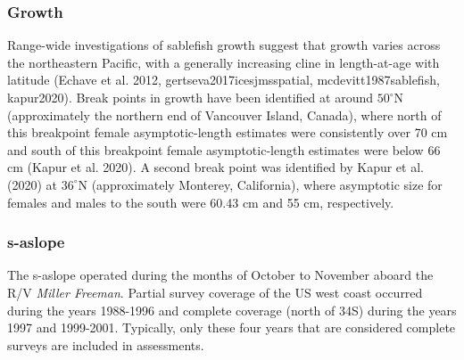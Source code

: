 \documentclass[11pt,
  english,
  a4paper,
]{article}
\begin{document}
\leavevmode\tagmcend\tagstructend\par


\hypertarget{growth}{%
\subsubsection{Growth}\label{growth}}

\leavevmode\tagmcend\tagstructend


Range-wide investigations of sablefish growth suggest that growth varies across the northeastern Pacific, with a generally increasing cline in length-at-age with latitude {(Echave et al. 2012, gertseva2017icesjmsspatial, mcdevitt1987sablefish, kapur2020)\leavevmode\tagmcend\tagstructend}. Break points in growth have been identified at around {\(50^\circ\)\leavevmode\tagmcend\tagstructend}N (approximately the northern end of Vancouver Island, Canada), where north of this breakpoint female asymptotic-length estimates were consistently over 70 cm and south of this breakpoint female asymptotic-length estimates were below 66 cm {(Kapur et al. 2020)\leavevmode\tagmcend\tagstructend}. A second break point was identified by {Kapur et al. (2020)\leavevmode\tagmcend\tagstructend} at {\(36^\circ\)\leavevmode\tagmcend\tagstructend}N (approximately Monterey, California), where asymptotic size for females and males to the south were 60.43 cm and 55 cm, respectively.

\leavevmode\tagmcend\tagstructend\par


\hypertarget{section}{%
\subsubsection{\texorpdfstring{\acrlong{s-aslope}}{}}\label{section}}

\leavevmode\tagmcend\tagstructend


The \gls{s-aslope} operated during the months of October to November aboard the R/V \emph{Miller Freeman}. Partial survey coverage of the US west coast occurred during the years 1988-1996 and complete coverage (north of 34\textquotesingle S) during the years 1997 and 1999-2001. Typically, only these four years that are considered complete surveys are included in assessments.
\end{document}
